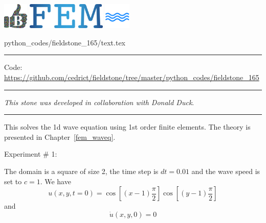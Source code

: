 \noindent
\includegraphics[height=1.25cm]{images/pictograms/benchmark}
\includegraphics[height=1.25cm]{images/pictograms/FEM}
\includegraphics[height=1.25cm]{images/pictograms/wave}


\begin{flushright} {\tiny {\color{gray} python\_codes/fieldstone\_165/text.tex}} \end{flushright}

%

\par\noindent\rule{\textwidth}{0.4pt}

\begin{center}
\inpython
{\small Code: \url{https://github.com/cedrict/fieldstone/tree/master/python_codes/fieldstone_165}}
\end{center}

\par\noindent\rule{\textwidth}{0.4pt}

{\sl This stone was developed in collaboration with Donald Duck}. 

\par\noindent\rule{\textwidth}{0.4pt}


This \stone solves the 1d wave equation using 1st order finite elements. 
The theory is presented in Chapter~\ref{fem_waveq}. 

Experiment \# 1:

The domain is a square of size 2, the time step is $dt=0.01$
and the wave speed is set to $c=1$. We have
\[
u(x,y,t=0)=\cos\left[ (x-1)\frac{\pi}{2}\right] \cos\left[ (y-1)\frac{\pi}{2} \right]
\]
and 
\[
\dot{u}(x,y,0)=0
\]
